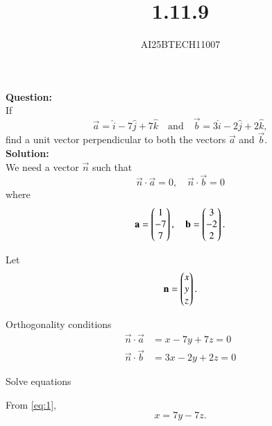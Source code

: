 \documentclass[journal]{IEEEtran}
\begin{document}

\vspace{3cm}

\title{1.11.9}
\author{AI25BTECH11007}
 \maketitle
{\let\newpage\relax\maketitle}

\renewcommand{\thefigure}{\theenumi}
\renewcommand{\thetable}{\theenumi}
\setlength{\intextsep}{10pt} %


\renewcommand{\thetable}{\theenumi}
\noindent
\textbf{Question:}\\
If
\[
\vec{a} = \hat{i} - 7\hat{j} + 7\hat{k}
\quad \text{and} \quad
\vec{b} = 3\hat{i} - 2\hat{j} + 2\hat{k},
\]
find a unit vector perpendicular to both the vectors $\vec{a}$ and $\vec{b}$.\\
\textbf{Solution:}\\
We need a vector $\vec{n}$ such that
\begin{equation}
\vec{n} \cdot \vec{a} = 0, \quad \vec{n} \cdot \vec{b} = 0
\end{equation}
where
\begin{equation}
\mathbf{a} = \begin{pmatrix}1 \\ -7 \\ 7\end{pmatrix}, \quad 
\mathbf{b} = \begin{pmatrix}3 \\ -2 \\ 2\end{pmatrix}.
\end{equation}

Let
\begin{equation}
\mathbf{n} = \begin{pmatrix}x \\ y \\ z\end{pmatrix}.
\end{equation}

Orthogonality conditions
\begin{align}
\vec{n} \cdot \vec{a} &= x - 7y + 7z = 0 \label{eq:1} \\
\vec{n} \cdot \vec{b} &= 3x - 2y + 2z = 0 \label{eq:2}
\end{align}

Solve equations

From \eqref{eq:1},
\begin{equation}
x = 7y - 7z. \label{eq:3}
\end{equation}
\end{document}
